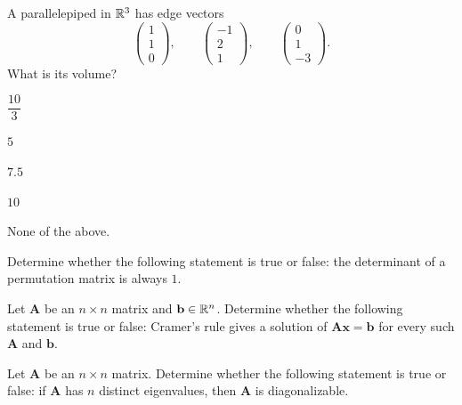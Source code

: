 \documentclass[11pt,oneside]{article}
\begin{document}
\begin{problem}
A parallelepiped in $\mathbb{R}^3$ has edge vectors
\[
\begin{pmatrix}1\\1\\0\end{pmatrix},
\qquad
\begin{pmatrix}-1\\2\\1\end{pmatrix},
\qquad
\begin{pmatrix}0\\1\\-3\end{pmatrix}.
\]
What is its volume?
\begin{problemchoices}
\item $\dfrac{10}{3}$
\item $5$
\item $7.5$
\item $10$
\item None of the above.
\end{problemchoices}
\end{problem}

\begin{problem}
Determine whether the following statement is true or false: the determinant of a permutation matrix is always $1$.
\end{problem}

\begin{problem}
Let $\mathbf A$ be an $n\times n$ matrix and $\mathbf b\in\mathbb{R}^n$. Determine whether the following statement is true or false: Cramer's rule gives a solution of $\mathbf A\mathbf x=\mathbf b$ for every such $\mathbf A$ and $\mathbf b$.
\end{problem}

\begin{problem}
Let $\mathbf A$ be an $n\times n$ matrix. Determine whether the following statement is true or false: if $\mathbf A$ has $n$ distinct eigenvalues, then $\mathbf A$ is diagonalizable.
\end{problem}
\end{document}
